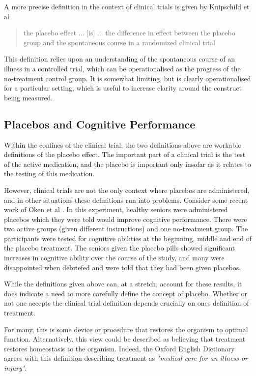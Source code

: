 A more precise definition in the context of clinical trials is given by Knipschild et al \cite{Knipschild2005}

\begin{quotation}
   the placebo effect ... [is] ... the difference in effect between the placebo group and the spontaneous course in a randomized clinical trial 
\end{quotation}

This definition relies upon an understanding of the spontaneous course of an illness in a controlled trial, which can be operationalised as the progress of the no-treatment control group. It is somewhat limiting, but is clearly operationalised for a particular setting, which is useful to increase clarity around the construct  being measured. 

\subsection{Placebos and Cognitive Performance}
\label{sec:plac-cogn-perf}

Within the confines of the clinical trial, the two definitions above are workable definitions of the placebo effect. The important part of a clinical trial is the test of the active medication, and the placebo is important only insofar as it relates to the testing of this medication. 

However, clinical trials are not the only context where placebos are administered, and in other situations these definitions run into problems. Consider some recent work of Oken et al \cite{Oken2008}. In this experiment, healthy seniors were administered placebos which they were told would improve cognitive performance. There were two active groups (given different instructions) and one no-treatment group. The participants were tested for cognitive abilities at the beginning, middle and end of the placebo treatment.  The seniors given the placebo pills showed significant increases in cognitive ability over the course of the study, and many were disappointed when debriefed and were told that they had been given placebos.

While the definitions given above can, at a stretch, account for these results, it does indicate a need to more carefully define the concept of placebo. Whether or not one accepts the clinical trial definition depends crucially on ones definition of treatment. 

For many, this is some device or procedure that restores the organism to optimal function. Alternatively, this view could be described as believing that treatment restores homeostasis to the organism. Indeed, the Oxford English Dictionary agrees with this definition describing treatment as \textit{"medical care for an illness or injury"}.

